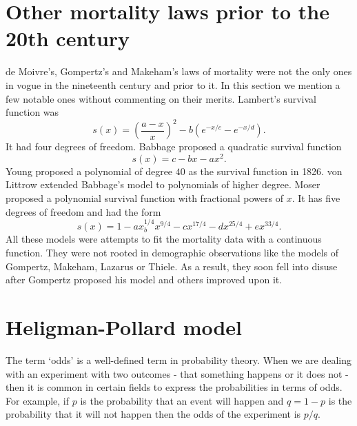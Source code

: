\documentclass{article}
\numberwithin{equation}{section}
\begin{document}
\section{Other mortality laws prior to the 20th century}\label{s4}
de Moivre's, Gompertz's and Makeham's laws of mortality were not the only
ones in vogue in the nineteenth century and prior to it. In this section we
mention a few notable ones without commenting on their merits. Lambert's
survival function \cite{lambert1776dottrina} was
\begin{equation}\label{s4e1}
s(x) = \left(\frac{a - x}{x}\right)^2 - b\left(e^{-x/c} - e^{-x/d}\right).
\end{equation}
It had four degrees of freedom. Babbage\cite{babbage1823tables} proposed a 
quadratic survival function
\begin{equation}\label{s4e2}
s(x) = c - bx - ax^2.
\end{equation}
Young proposed a polynomial of degree $40$ as the survival function in 
\cite{adler1866memoir} 1826. von Littrow\cite{von1832lebensversicherungen}
extended Babbage's model to polynomials of higher degree. Moser
\cite{moser1839gesetze} proposed a polynomial survival function with 
fractional powers of $x$. It has five degrees of freedom and had the form
\begin{equation}\label{s4e3}
s(x) = 1 - ax^{1/4} _ bx^{9/4} - cx^{17/4} - dx^{25/4} + ex^{33/4}.
\end{equation}
All these models were attempts to fit the mortality data with a continuous 
function. They were not rooted in demographic observations like the models
of Gompertz, Makeham, Lazarus or Thiele. As a result, they soon fell into
disuse after Gompertz proposed his model and others improved upon it.

\section{Heligman-Pollard model}\label{s5}
The term `odds' is a well-defined term in probability theory. When we are 
dealing with an experiment with two outcomes - that something happens or 
it does not - then it is common in certain fields to express the 
probabilities in terms of odds.  For example, if $p$ is the probability 
that an event will happen and $q = 1 - p$ is the probability that it will 
not happen then the odds of the experiment is $p/q$. 
\end{document}
